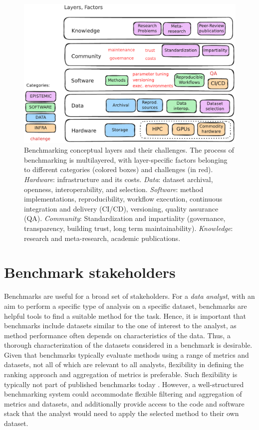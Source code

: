 \documentclass[11pt]{article}
\begin{document}
\begin{figure}
    \centering
    \includegraphics[width=0.8\linewidth]{figures/fig2_bens_layers.pdf}
    \caption[Benchmarking conceptual layers and their challenges.]{Benchmarking conceptual layers and their challenges. The process of benchmarking is multilayered, with layer-specific factors belonging to different categories (colored boxes) and challenges (in red). \emph{Hardware}: infrastructure and its costs. \emph{Data}: dataset archival, openness, interoperability, and selection.  \emph{Software}: method implementations, reproducibility, workflow execution, continuous integration and delivery (CI/CD), versioning, quality assurance (QA). \emph{Community}: Standardization and impartiality (governance, transparency, building trust, long term maintainability). \emph{Knowledge}: research and meta-research, academic publications.}
    \label{fig:layers}
\end{figure}

\section*{Benchmark stakeholders}

Benchmarks are useful for a broad set of stakeholders. For a \emph{data analyst}, with an aim to perform a specific type of analysis on a specific dataset, benchmarks are helpful tools to find a suitable method for the task. Hence, it is important that benchmarks include datasets similar to the one of interest to the analyst, as method performance often depends on characteristics of the data. Thus, a thorough characterization of the datasets considered in a benchmark is desirable. Given that benchmarks typically evaluate methods using a range of metrics and datasets, not all of which are relevant to all analysts, flexibility in defining the ranking approach and aggregation of metrics is preferable. Such flexibility is typically not part of published benchmarks today \cite{Sonrel2023-te}. However, a well-structured benchmarking system could accommodate flexible filtering and aggregation of metrics and datasets, and additionally provide access to the code and software stack that the analyst would need to apply the selected method to their own dataset. 
\end{document}

